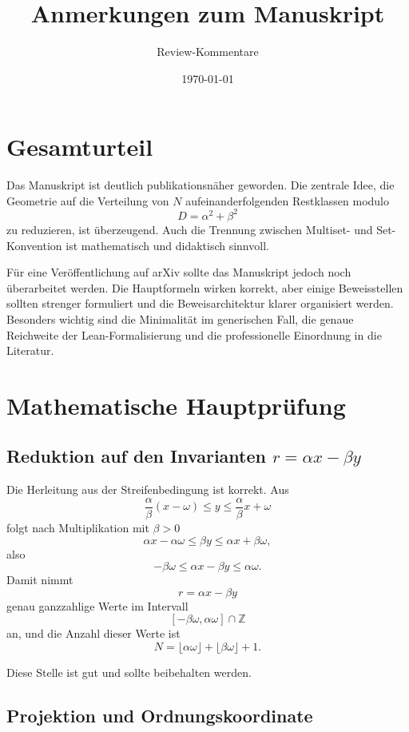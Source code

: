 \documentclass[11pt]{article}
\title{Anmerkungen zum Manuskript\\
\paper{Period Formulas for Rational Cut-and-Project Strip Projections:\\ Multiset and Set Cases}}
\author{Review-Kommentare}
\date{\today}
\begin{document}
\maketitle

\section*{Gesamturteil}

Das Manuskript ist deutlich publikationsnäher geworden. Die zentrale Idee, die Geometrie auf die Verteilung von
\(N\) aufeinanderfolgenden Restklassen modulo
\[
    D=\alpha^2+\beta^2
\]
zu reduzieren, ist überzeugend. Auch die Trennung zwischen Multiset- und Set-Konvention ist mathematisch und didaktisch sinnvoll.

Für eine Veröffentlichung auf arXiv sollte das Manuskript jedoch noch überarbeitet werden. Die Hauptformeln wirken korrekt, aber einige Beweisstellen sollten strenger formuliert und die Beweisarchitektur klarer organisiert werden. Besonders wichtig sind die Minimalität im generischen Fall, die genaue Reichweite der Lean-Formalisierung und die professionelle Einordnung in die Literatur.

\section{Mathematische Hauptprüfung}

\subsection{Reduktion auf den Invarianten \texorpdfstring{\(r=\alpha x-\beta y\)}{r}}

Die Herleitung aus der Streifenbedingung ist korrekt. Aus
\[
    \frac{\alpha}{\beta}(x-\omega)\le y\le \frac{\alpha}{\beta}x+\omega
\]
folgt nach Multiplikation mit \(\beta>0\)
\[
    \alpha x-\alpha\omega \le \beta y \le \alpha x+\beta\omega,
\]
also
\[
    -\beta\omega \le \alpha x-\beta y \le \alpha\omega.
\]
Damit nimmt
\[
    r=\alpha x-\beta y
\]
genau ganzzahlige Werte im Intervall
\[
    [-\beta\omega,\alpha\omega]\cap\mathbb Z
\]
an, und die Anzahl dieser Werte ist
\[
    N=\lfloor \alpha\omega\rfloor+\lfloor \beta\omega\rfloor+1.
\]

Diese Stelle ist gut und sollte beibehalten werden.

\subsection{Projektion und Ordnungskoordinate}
\end{document}
